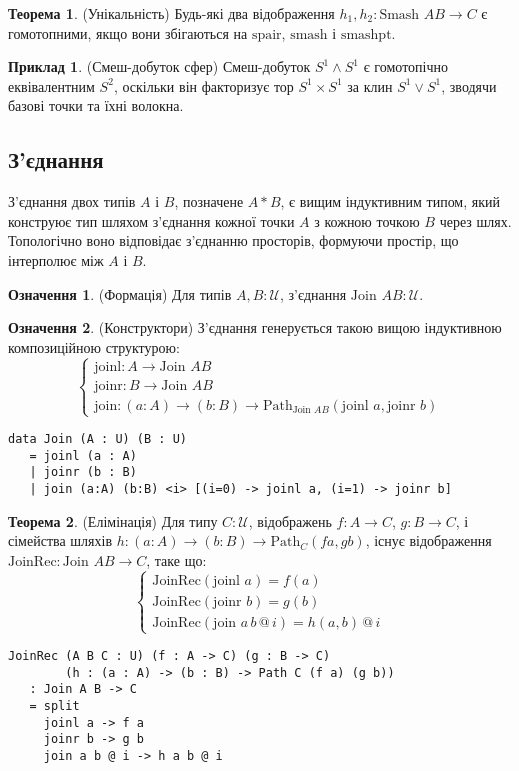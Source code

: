\documentclass{article}
\theoremstyle{definition}
\newtheorem{theorem}{Теорема}
\newtheorem{definition}{Означення}
\newtheorem{example}{Приклад}
\begin{document}
\begin{theorem} (Унікальність)
Будь-які два відображення \( h_1, h_2 : \text{Smash } A B \to C \) є гомотопними,
якщо вони збігаються на \( \text{spair} \), \( \text{smash} \) і \( \text{smashpt} \).
\end{theorem}

\begin{example} (Смеш-добуток сфер)
Смеш-добуток \( S^1 \wedge S^1 \) є гомотопічно еквівалентним \( S^2 \),
оскільки він факторизує тор \( S^1 \times S^1 \) за клин \( S^1 \vee S^1 \),
зводячи базові точки та їхні волокна.
\end{example}

\newpage
\subsection{З’єднання}
З’єднання двох типів \( A \) і \( B \), позначене \( A * B \),
є вищим індуктивним типом, який конструює тип шляхом
з’єднання кожної точки \( A \) з кожною точкою \( B \) через шлях.
Топологічно воно відповідає з’єднанню просторів, формуючи
простір, що інтерполює між \( A \) і \( B \).

\begin{definition} (Формація)
Для типів \( A, B : \mathcal{U} \), з’єднання \( \text{Join } A B : \mathcal{U} \).
\end{definition}

\begin{definition} (Конструктори)
З’єднання генерується такою вищою індуктивною композиційною структурою:
\[
\begin{cases}
\text{joinl} : A \to \text{Join } A B \\
\text{joinr} : B \to \text{Join } A B \\
\text{join} : (a : A) \to (b : B) \to \text{Path}_{\text{Join } A B} (\text{joinl } a, \text{joinr } b)
\end{cases}
\]
\begin{lstlisting}
data Join (A : U) (B : U)
   = joinl (a : A)
   | joinr (b : B)
   | join (a:A) (b:B) <i> [(i=0) -> joinl a, (i=1) -> joinr b]
\end{lstlisting}
\end{definition}

\begin{theorem} (Елімінація)
Для типу \( C : \mathcal{U} \), відображень \( f : A \to C \), \( g : B \to C \),
і сімейства шляхів \( h : (a : A) \to (b : B) \to \text{Path}_C (f a, g b) \),
існує відображення \( \text{JoinRec} : \text{Join } A B \to C \), таке що:
\[
\begin{cases}
\text{JoinRec}(\text{joinl } a) = f(a) \\
\text{JoinRec}(\text{joinr } b) = g(b) \\
\text{JoinRec}(\text{join } a \, b \, @ \, i) = h(a, b) \, @ \, i
\end{cases}
\]
\begin{lstlisting}
JoinRec (A B C : U) (f : A -> C) (g : B -> C)
        (h : (a : A) -> (b : B) -> Path C (f a) (g b))
   : Join A B -> C
   = split
     joinl a -> f a
     joinr b -> g b
     join a b @ i -> h a b @ i
\end{lstlisting}
\end{theorem}
\end{document}
